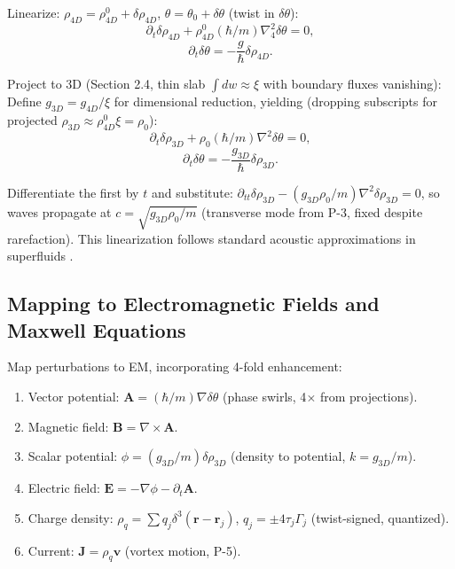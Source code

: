 \documentclass{article}
\begin{document}
Linearize: $\rho_{4D} = \rho_{4D}^0 + \delta \rho_{4D}$, $\theta = \theta_0 + \delta \theta$ (twist in $\delta \theta$):
\begin{equation}
\partial_t \delta \rho_{4D} + \rho_{4D}^0 (\hbar / m) \nabla_4^2 \delta \theta = 0,
\end{equation}
\begin{equation}
\partial_t \delta \theta = -\frac{g}{\hbar} \delta \rho_{4D}.
\end{equation}

Project to 3D (Section 2.4, thin slab $\int dw \approx \xi$ with boundary fluxes vanishing): Define $g_{3D} = g_{4D} / \xi$ for dimensional reduction, yielding (dropping subscripts for projected $\rho_{3D} \approx \rho_{4D}^0 \xi = \rho_0$):
\begin{equation}
\partial_t \delta \rho_{3D} + \rho_0 (\hbar / m) \nabla^2 \delta \theta = 0,
\end{equation}
\begin{equation}
\partial_t \delta \theta = -\frac{g_{3D}}{\hbar} \delta \rho_{3D}.
\end{equation}

Differentiate the first by $t$ and substitute: $\partial_{tt} \delta \rho_{3D} - (g_{3D} \rho_0 / m) \nabla^2 \delta \rho_{3D} = 0$, so waves propagate at $c = \sqrt{g_{3D} \rho_0 / m}$ (transverse mode from P-3, fixed despite rarefaction). This linearization follows standard acoustic approximations in superfluids \cite{garay2000sonic}.

\subsection{Mapping to Electromagnetic Fields and Maxwell Equations}

Map perturbations to EM, incorporating 4-fold enhancement:

\begin{enumerate}
\item Vector potential: $\mathbf{A} = (\hbar / m) \nabla \delta \theta$ (phase swirls, 4$\times$ from projections).
\item Magnetic field: $\mathbf{B} = \nabla \times \mathbf{A}$.
\item Scalar potential: $\phi = (g_{3D} / m) \delta \rho_{3D}$ (density to potential, $k = g_{3D}/m$).
\item Electric field: $\mathbf{E} = -\nabla \phi - \partial_t \mathbf{A}$.
\item Charge density: $\rho_q = \sum q_j \delta^3(\mathbf{r} - \mathbf{r}_j)$, $q_j = \pm 4 \tau_j \Gamma_j$ (twist-signed, quantized).
\item Current: $\mathbf{J} = \rho_q \mathbf{v}$ (vortex motion, P-5).
\end{enumerate}
\end{document}
